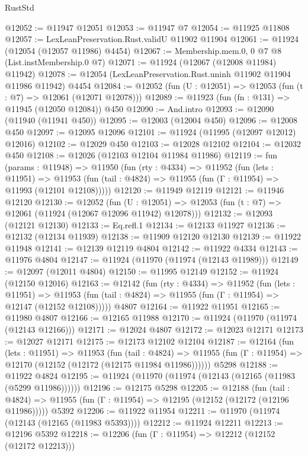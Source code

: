 \begin{lexlean}{RustStd}
\begin{coremodule}
@12052 := @11947 @12051
@12053 := @11947 @7
@12054 := @11925 @11808
@12057 := LexLeanPreservation.Rust.validU @11902 @11904
@12061 := @11924 (@12054 (@12057 @11986) @4454)
@12067 := Membership.mem.{0, 0} @7 @8 (List.instMembership.{0} @7)
@12071 := @11924 (@12067 (@12008 @11984) @11942)
@12078 := @12054 (LexLeanPreservation.Rust.uninh @11902 @11904 @11986 @11942) @4454
@12084 := @12052 (fun (U : @12051) => @12053 (fun (t : @7) => @12061 (@12071 @12078)))
@12089 := @11923 (fun (fn : @131) => @11945 (@12050 @12084)) @450
@12090 := And.intro
@12093 := @12090 (@11940 (@11941 @450))
@12095 := @12003 (@12004 @450)
@12096 := @12008 @450
@12097 := @12095 @12096
@12101 := @11924 (@11995 (@12097 @12012) @12016)
@12102 := @12029 @450
@12103 := @12028 @12102
@12104 := @12032 @450
@12108 := @12026 (@12103 @12104 @11984 @11986)
@12119 := fun (params : @11948) =>
  @11950
    (fun (rty : @4334) =>
    @11952
      (fun (lets : @11951) =>
      @11953 (fun (tail : @4824) => @11955 (fun (Γ : @11954) => @11993 (@12101 @12108)))))
@12120 := @11949 @12119
@12121 := @11946 @12120
@12130 := @12052
    (fun (U : @12051) => @12053 (fun (t : @7) => @12061 (@11924 (@12067 @12096 @11942) @12078)))
@12132 := @12093 (@12121 @12130)
@12133 := Eq.refl.{1}
@12134 := @12133 @11927
@12136 := @12132 (@12134 @11939)
@12138 := @11909 @12120 @12130
@12139 := @11922 @11948
@12141 := @12139 @12119 @4804
@12142 := @11922 @4334
@12143 := @11976 @4804
@12147 := @11924 (@11970 (@11974 (@12143 @11989)))
@12149 := @12097 (@12011 @4804)
@12150 := @11995 @12149
@12152 := @11924 (@12150 @12016)
@12163 := @12142
    (fun (rty : @4334) =>
    @11952
      (fun (lets : @11951) =>
      @11953 (fun (tail : @4824) => @11955 (fun (Γ : @11954) => @12147 (@12152 @12108)))))
    @4807
@12164 := @11922 @11951
@12165 := @11980 @4807
@12166 := @12165 @11988
@12170 := @11924 (@11970 (@11974 (@12143 @12166)))
@12171 := @12024 @4807
@12172 := @12023 @12171
@12173 := @12027 @12171
@12175 := @12173 @12102 @12104
@12187 := @12164
    (fun (lets : @11951) =>
    @11953
      (fun (tail : @4824) =>
      @11955 (fun (Γ : @11954) => @12170 (@12152 (@12172 (@12175 @11984 @11986))))))
    @5298
@12188 := @11922 @4824
@12195 := @11924 (@11970 (@11974 (@12143 (@12165 (@11983 (@5299 @11986))))))
@12196 := @12175 @5298
@12205 := @12188
    (fun (tail : @4824) => @11955 (fun (Γ : @11954) => @12195 (@12152 (@12172 (@12196 @11986)))))
    @5392
@12206 := @11922 @11954
@12211 := @11970 (@11974 (@12143 (@12165 (@11983 @5393))))
@12212 := @11924 @12211
@12213 := @12196 @5392
@12218 := @12206 (fun (Γ : @11954) => @12212 (@12152 (@12172 @12213)))

\end{coremodule}
\end{lexlean}
